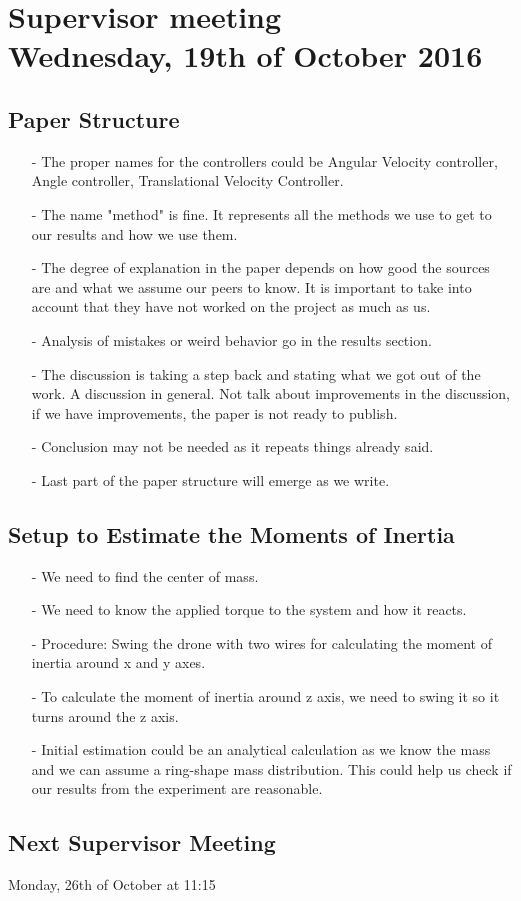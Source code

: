 
\renewcommand{\vec}[1]{\boldsymbol{\mathbf{#1}}}

\renewcommand\chaptername{KAPITEL}
\renewcommand\contentsname{Indhold}
\renewcommand\figurename{Figur}
\renewcommand\tablename{Tabel}

\section*{Supervisor meeting\\ \small Wednesday, 19th of October 2016}

\subsection{Paper Structure}
\begin{itemize}
  \item[-] The proper names for the controllers could be Angular Velocity controller, Angle controller, Translational Velocity Controller.
  \item[-] The name "method" is fine. It represents all the methods we use to get to our results and how we use them.
  \item[-] The degree of explanation in the paper depends on how good the sources are and what we assume our peers to know. It is important to take into account that they have not worked on the project as much as us.
  \item[-] Analysis of mistakes or weird behavior go in the results section.
  \item[-] The discussion is taking a step back and stating what we got out of the work. A discussion in general. Not talk about improvements in the discussion, if we have improvements, the paper is not ready to publish.
  \item[-] Conclusion may not be needed as it repeats things already said.
  \item[-] Last part of the paper structure will emerge as we write.
\end{itemize}

\subsection{Setup to Estimate the Moments of Inertia}
\begin{itemize}
  \item[-] We need to find the center of mass.
  \item[-] We need to know the applied torque to the system and how it reacts.
  \item[-] Procedure: Swing the drone with two wires for calculating the moment of inertia around x and y axes.
  \item[-] To calculate the moment of inertia around z axis, we need to swing it so it turns around the z axis.
  \item[-] Initial estimation could be an analytical calculation as we know the mass and we can assume a ring-shape mass distribution. This could help us check if our results from the experiment are reasonable.
\end{itemize}

\subsection{Next Supervisor Meeting}
Monday, 26th of October at 11:15

